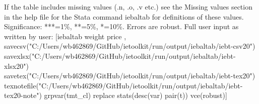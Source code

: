 If the table includes missing values (.n, .o, .v etc.) see the Missing values section in the help file for the Stata command iebaltab for definitions of these values. Significance: ***=1\%, **=5\%, *=10\%. Errors are robust. Full user input as written by user: [iebaltab weight price , savecsv("C:/Users/wb462869/GitHub/ietoolkit/run/output/iebaltab/iebt-csv20") savexlsx("C:/Users/wb462869/GitHub/ietoolkit/run/output/iebaltab/iebt-xlsx20") savetex("C:/Users/wb462869/GitHub/ietoolkit/run/output/iebaltab/iebt-tex20") texnotefile("C:/Users/wb462869/GitHub/ietoolkit/run/output/iebaltab/iebt-tex20-note") grpvar(tmt\_cl) replace stats(desc(var) pair(t)) vce(robust)]
